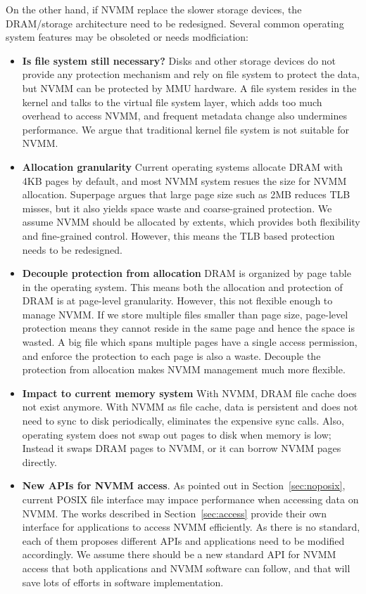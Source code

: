On the other hand, if NVMM replace the slower storage devices, the DRAM/storage
architecture need to be redesigned. Several common operating system features
may be obsoleted or needs modficiation:
\begin{itemize}
\item \textbf{Is file system still necessary?}
Disks and other storage devices do not provide any
protection mechanism and rely on file system to protect the data, but NVMM
can be protected by MMU hardware. A file system resides in the kernel and
talks to the virtual file system layer, which adds too much overhead to access
NVMM, and frequent metadata change also undermines performance. We argue that
traditional kernel file system is not suitable for NVMM. 
\item \textbf{Allocation granularity}
Current operating systems allocate DRAM with 4KB pages by default,
and most NVMM system resues the size for NVMM allocation. Superpage argues
that large page size such as 2MB reduces TLB misses, but it also yields
space waste and coarse-grained protection. We assume NVMM should be allocated
by extents, which provides both flexibility and fine-grained control. However,
this means the TLB based protection needs to be redesigned.
\item \textbf{Decouple protection from allocation} DRAM is organized by 
page table in the operating system. This means both the allocation and
protection of DRAM is at page-level granularity. However, this not flexible
enough to manage NVMM. If we store multiple files smaller than page size,
page-level protection means they cannot reside in the same page and hence
the space is wasted. A big file which spans multiple pages have a single
access permission, and enforce the protection to each page is also a waste.
Decouple the protection from allocation makes NVMM management much more
 flexible.
\item \textbf{Impact to current memory system}
With NVMM, DRAM file cache does not exist anymore. With NVMM as file cache,
data is persistent and does not need to sync to disk periodically, eliminates
the expensive sync calls.
Also, operating system does not swap out pages to disk when memory is low;
Instead it swaps DRAM pages to NVMM, or it can borrow NVMM pages directly.
\item \textbf{New APIs for NVMM access}.
As pointed out in Section~\ref{sec:noposix}, current POSIX file 
interface may impace performance when accessing data on NVMM.
The works described in Section~\ref{sec:access} provide their own interface
for applications to access NVMM efficiently. As there is no standard, each of
them proposes different APIs and applications need to be modified accordingly.
We assume there should be a new standard API for NVMM access that both
applications and NVMM software can follow, and that will save lots of efforts
in software implementation. 
\end{itemize}

